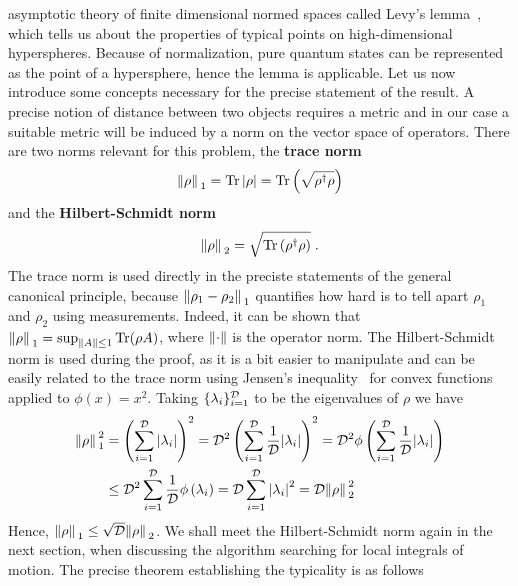 asymptotic theory of finite dimensional normed spaces called Levy's lemma~\autocite{VitaliD.Milman1986}, which
tells us about the properties of typical points on high-dimensional hyperspheres. Because of normalization, pure quantum states
can be represented as the point of a hypersphere, hence the lemma is applicable.
Let us now
introduce some concepts necessary for the precise statement of the result. A precise notion of distance between two objects requires a metric and in
our case a suitable metric will be induced by a norm on the vector space of operators. There are two norms relevant
for this problem, the \textbf{trace norm}
\begin{equation}
	\norm*{\rho}_1 = \Tr\abs{\rho} = \Tr\left(\sqrt{\rho^{\dagger}\rho}\right)
\end{equation}
and the \textbf{Hilbert-Schmidt norm}
\begin{equation}
	\norm*{\rho}_2 = \sqrt{\Tr\left(\rho^{\dagger}\rho\right)}\;.
\end{equation}
The trace norm is used directly in the preciste statements of the general canonical principle, because
\(\norm*{\rho_1 - \rho_2}_1\) quantifies how hard is to tell apart \(\rho_1\) and \(\rho_2\) using measurements.
Indeed, it can be shown that \(\norm*{\rho}_1 = \mathrm{sup}_{\norm{A}\leq 1} \Tr(\rho A)\), where \(\norm{\cdot}\) is the operator norm.
The Hilbert-Schmidt norm is used during the proof, as it is a bit easier to manipulate and can be easily related to the
trace norm using Jensen's inequality~\autocite{Jensen1906} for convex functions applied to \(\phi(x) = x^2\). Taking \(\{\lambda_i\}_{i=1}^{\mathcal{D}}\) to be
the eigenvalues of \(\rho\) we have
\begin{align}
	\norm*{\rho}_1^2 &= \left(\sum_{i=1}^{\mathcal{D}}\abs{\lambda_i}\right)^2 = \mathcal{D}^2  \left(\sum_{i=1}^{\mathcal{D}}\frac{1}{\mathcal{D}}\abs{\lambda_i}\right)^2 
	= \mathcal{D}^2 \phi\left(\sum_{i=1}^{\mathcal{D}}\frac{1}{\mathcal{D}}\abs{\lambda_i}\right) \nonumber \\
	&\leq  {\mathcal{D}}^2 \sum_{i=1}^{\mathcal{D}}\frac{1}{\mathcal{D}} \phi\left(\lambda_i\right) 
	= \mathcal{D} \sum_{i=1}^{\mathcal{D}} \abs{\lambda_i}^2 = \mathcal{D} \norm*{\rho}_2^2
\end{align}
Hence, \(\norm*{\rho}_1 \leq \sqrt{\mathcal{D}}\norm*{\rho}_2\). We shall meet the Hilbert-Schmidt norm again in the next section,
when discussing the algorithm searching for local integrals of motion. 
The precise theorem establishing the typicality is as follows
